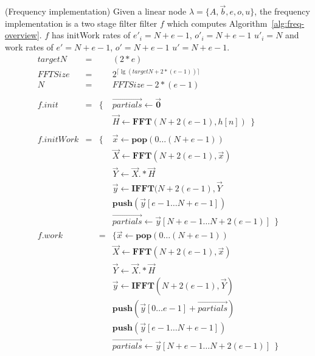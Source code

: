 \begin{transformation} (Frequency implementation)
Given a linear node $\lambda = \{A, {\vec b}, e, o, u\}$, 
the frequency implementation is a two stage filter filter $f$ which
computes Algorithm~\ref{alg:freq-overview}. $f$ has
initWork rates of $e'_{i}=N+e-1$, $o'_{i}=N+e-1$ $u'_{i}=N$ and
work rates of $e'=N+e-1$, $o'=N+e-1$ $u'=N+e-1$.
\\
\begin{equation} \nonumber
  \begin{array}{rccl}
    targetN & = &&  (2*e) \\
    FFTSize & = &&  2^{\lceil \lg(targetN + 2*(e-1)) \rceil} \\
    N       & = &&  FFTSize - 2*(e-1) \\ 
    \\
    f.init  & = &\{&\vec{partials} \leftarrow \vec{\mathbf{0}} \\
            &   &&  \vec{H} \leftarrow \mathbf{FFT}(N+2(e-1),h[n])~~\} \\
    \\
    f.initWork & = &\{&\vec{x} \leftarrow \mathbf{pop}(0 \dots (N+e-1)) \\
           &     &&\vec{X} \leftarrow \mathbf{FFT} (N+2(e-1), \vec{x}) \\
           &     &&\vec{Y} \leftarrow \vec{X} .* \vec{H} \\
           &     &&\vec{y} \leftarrow \mathbf{IFFT}(N+2(e-1), \vec{Y} \\
           &     &&\mathbf{push}(\vec{y}[e-1 \dots N+e-1]) \\
           &     &&\vec{partials} \leftarrow \vec{y}[N+e-1 \dots N+2(e-1)]~~\} \\
    f.work &   & = &\{\vec{x} \leftarrow \mathbf{pop}(0 \dots (N+e-1)) \\
           &     &&\vec{X} \leftarrow \mathbf{FFT} (N+2(e-1), \vec{x}) \\
           &     &&\vec{Y} \leftarrow \vec{X} .* \vec{H} \\
           &     &&\vec{y} \leftarrow \mathbf{IFFT}(N+2(e-1), \vec{Y}) \\
           &     &&\mathbf{push}(\vec{y}[0 \dots e-1] + \vec{partials})\\
           &     &&\mathbf{push}(\vec{y}[e-1 \dots N+e-1]) \\
           &     &&\vec{partials} \leftarrow \vec{y}[N+e-1 \dots N+2(e-1)]~~\} \\
    \end{array}
\end{equation}
\label{trans:freq}
\end{transformation}



